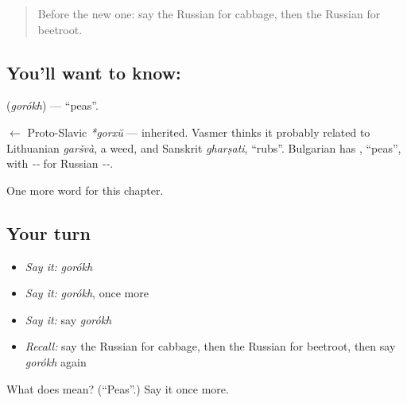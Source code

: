 \label{lesson:RU-C194-gorokh}



\begin{quote}
Before the new one: say the Russian for cabbage, then the Russian for beetroot.
\end{quote}

\subsection*{You'll want to know: }
\textbf{} (\emph{gorókh}) — \textquotedblleft{}peas\textquotedblright{}.

\begin{cousinweb}
\textbf{} $\leftarrow$ Proto-Slavic \emph{*gorxŭ} — inherited. Vasmer thinks it probably related to Lithuanian \emph{garšvà}, a weed, and Sanskrit \emph{gharṣati}, \textquotedblleft{}rubs\textquotedblright{}. Bulgarian has \emph{}, \textquotedblleft{}peas\textquotedblright{}, with \emph{--} for Russian \emph{--}.
\end{cousinweb}

\begin{grammarlens}[title={What you've built}]
One more word for this chapter.
\end{grammarlens}

\subsection*{Your turn}
\begin{itemize}
\raggedright
  \item \emph{Say it:} \emph{gorókh}
  \item \emph{Say it:} \emph{gorókh}, once more
  \item \emph{Say it:} say \emph{gorókh}
  \item \emph{Recall:} say the Russian for cabbage, then the Russian for beetroot, then say \emph{gorókh} again
\end{itemize}

\begin{tcolorbox}[breakable,colback=teal!4,colframe=teal!35!black,title={Before you move on}]
What does  mean? (\textquotedblleft{}Peas\textquotedblright{}.) Say it once more.
\end{tcolorbox}
